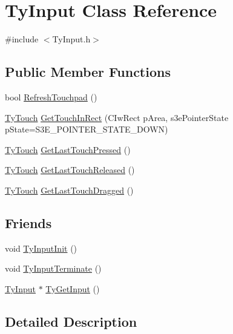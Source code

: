 \hypertarget{class_ty_input}{
\section{TyInput Class Reference}
\label{class_ty_input}
}


{\ttfamily \#include $<$TyInput.h$>$}

\subsection*{Public Member Functions}
\begin{DoxyCompactItemize}
\item 
bool \hyperlink{class_ty_input_a8c905dc936b2276d7917e60463b7401c}{RefreshTouchpad} ()
\item 
\hyperlink{struct_ty_touch}{TyTouch} \hyperlink{class_ty_input_a5c868575326770f317c15d28e9d9884f}{GetTouchInRect} (CIwRect pArea, s3ePointerState pState=S3E\_\-POINTER\_\-STATE\_\-DOWN)
\item 
\hyperlink{struct_ty_touch}{TyTouch} \hyperlink{class_ty_input_a04402a8d838fb2765b0c73d44006e656}{GetLastTouchPressed} ()
\item 
\hyperlink{struct_ty_touch}{TyTouch} \hyperlink{class_ty_input_a6d0e846e6107b992b9e96e7d99816d83}{GetLastTouchReleased} ()
\item 
\hyperlink{struct_ty_touch}{TyTouch} \hyperlink{class_ty_input_a0c7dfabead3ae7c00052d6bdba9bb22b}{GetLastTouchDragged} ()
\end{DoxyCompactItemize}
\subsection*{Friends}
\begin{DoxyCompactItemize}
\item 
void \hyperlink{class_ty_input_a8823adfe46e5b1352a3045fddad7126e}{TyInputInit} ()
\item 
void \hyperlink{class_ty_input_a0f6ef95051c6eff4f8f80ba7f1e95c54}{TyInputTerminate} ()
\item 
\hyperlink{class_ty_input}{TyInput} $\ast$ \hyperlink{class_ty_input_ade15876f25b013771fe9c9776acc9de7}{TyGetInput} ()
\end{DoxyCompactItemize}


\subsection{Detailed Description}


